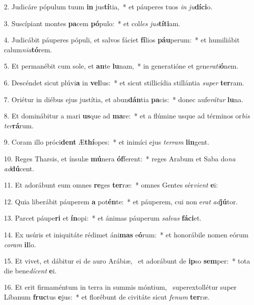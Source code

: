 2. Judicáre pópulum tuum \textbf{in} jus\textbf{tí}tia,~*  et páuperes tuos \textit{in} \textit{ju}\textbf{dí}\textbf{ci}o.\

3. Suscípiant montes \textbf{pa}cem \textbf{pó}pulo:~*  et col\textit{les} \textit{jus}\textbf{tí}\textbf{ti}am.\

4. Judicábit páuperes pópuli, et salvos fáciet \textbf{fí}lios \textbf{páu}perum:~*  et humiliábit calum\textit{ni}\textit{a}\textbf{tó}rem.\

5. Et permanébit cum sole, et \textbf{an}te \textbf{lu}nam,~*  in generatióne et gene\textit{ra}\textit{ti}\textbf{ó}nem.\

6. Descéndet sicut plúvi\textbf{a} in \textbf{vel}lus:~*  et sicut stillicídia stillántia \textit{su}\textit{per} \textbf{ter}ram.\

7. Oriétur in diébus ejus justítia, et abun\textbf{dán}tia \textbf{pa}cis:~*  donec aufe\textit{rá}\textit{tur} \textbf{lu}na.\

8. Et dominábitur a mari \textbf{us}que ad \textbf{ma}re:~*  et a flúmine usque ad términos or\textit{bis} \textit{ter}\textbf{rá}rum.\

9. Coram illo próci\textbf{dent} Æ\textbf{thí}opes:~*  et inimíci ejus \textit{ter}\textit{ram} \textbf{lin}gent.\

10. Reges Tharsis, et ínsulæ \textbf{mú}nera \textbf{óf}ferent:~*  reges Arabum et Saba do\textit{na} \textit{ad}\textbf{dú}cent.\

11. Et adorábunt eum omnes \textbf{re}ges \textbf{ter}ræ:~*  omnes Gentes sér\textit{vi}\textit{ent} \textbf{e}i:\

12. Quia liberábit páuperem \textbf{a} pot\textbf{én}te:~*  et páuperem, cui non e\textit{rat} \textit{ad}\textbf{jú}tor.\

13. Parcet páupe\textbf{ri} et \textbf{ín}opi:~*  et ánimas páuperum \textit{sal}\textit{vas} \textbf{fá}\textbf{ci}et.\

14. Ex usúris et iniquitáte rédimet áni\textbf{mas} e\textbf{ó}rum:~*  et honorábile nomen eórum \textit{co}\textit{ram} \textbf{il}lo.\

15. Et vivet, et dábitur ei de auro Arábiæ, \dag\  et adorábunt de \textbf{ip}so \textbf{sem}per:~*  tota die bene\textit{dí}\textit{cent} \textbf{e}i.\

16. Et erit firmaméntum in terra in summis móntium, \dag\  superextollétur super Líbanum \textbf{fruc}tus \textbf{e}jus:~*  et florébunt de civitáte sicut \textit{fe}\textit{num} \textbf{ter}ræ.\

